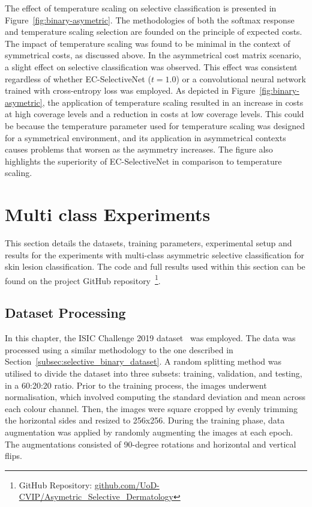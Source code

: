 The effect of temperature scaling on selective classification is presented in Figure~\ref{fig:binary-asymetric}. The methodologies of both the softmax response and temperature scaling selection are founded on the principle of expected costs. The impact of temperature scaling was found to be minimal in the context of symmetrical costs, as discussed above. In the asymmetrical cost matrix scenario, a slight effect on selective classification was observed. This effect was consistent regardless of whether EC-SelectiveNet ($t=1.0$) or a convolutional neural network trained with cross-entropy loss was employed. As depicted in Figure~\ref{fig:binary-asymetric}, the application of temperature scaling resulted in an increase in costs at high coverage levels and a reduction in costs at low coverage levels. This could be because the temperature parameter used for temperature scaling was designed for a symmetrical environment, and its application in asymmetrical contexts causes problems that worsen as the asymmetry increases. The figure also highlights the superiority of EC-SelectiveNet in comparison to temperature scaling.



\section{Multi class Experiments}
\label{sec:selective_multi_class_experiments}
This section details the datasets, training parameters, experimental setup and results for the experiments with multi-class asymmetric selective classification for skin lesion classification. The code and full results used within this section can be found on the project GitHub repository~\footnote{GitHub Repository: \url{github.com/UoD-CVIP/Asymetric_Selective_Dermatology}}.

\subsection{Dataset Processing}
In this chapter, the ISIC Challenge 2019 dataset~\citep{codella2018skin,combalia2019bcn20000,tschandl2018ham10000} was employed. The data was processed using a similar methodology to the one described in Section~\ref{subsec:selective_binary_dataset}. A random splitting method was utilised to divide the dataset into three subsets: training, validation, and testing, in a 60:20:20 ratio. Prior to the training process, the images underwent normalisation, which involved computing the standard deviation and mean across each colour channel. Then, the images were square cropped by evenly trimming the horizontal sides and resized to 256x256. During the training phase, data augmentation was applied by randomly augmenting the images at each epoch. The augmentations consisted of 90-degree rotations and horizontal and vertical flips.

